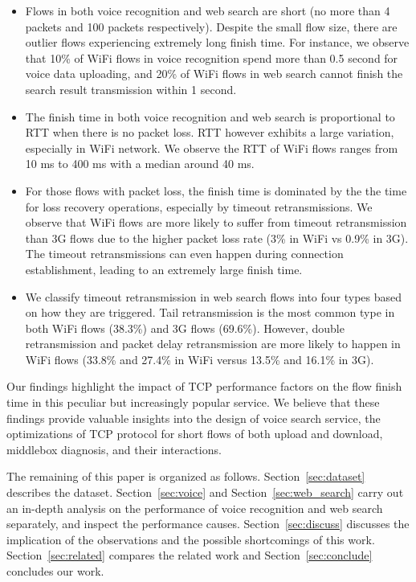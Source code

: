 

\begin{itemize}
\item Flows in both voice recognition and web search are short (no more than 4 packets and 100 packets respectively). Despite the small flow size, there are outlier flows experiencing extremely long finish time. For instance, we observe that 10\% of WiFi flows in voice recognition spend more than 0.5 second for voice data uploading, and 20\% of WiFi flows in web search cannot finish the search result transmission within 1 second.

\item The finish time in both voice recognition and web search is proportional to RTT when there is no packet loss. RTT however exhibits a large variation, especially in WiFi network. We observe the RTT of WiFi flows ranges from 10 ms to 400 ms with a median around 40 ms. 

\item For those flows with packet loss, the finish time is dominated by the the time for loss recovery operations, especially by timeout retransmissions. We observe that WiFi flows are more likely to suffer from timeout retransmission than 3G flows due to the higher packet loss rate (3\% in WiFi vs 0.9\% in 3G). The timeout retransmissions can even happen during connection establishment, leading to an extremely large finish time.

\item We classify timeout retransmission in web search flows into four types based on how they are triggered. Tail retransmission is the most common type in both WiFi flows (38.3\%) and 3G flows (69.6\%). However, double retransmission and packet delay retransmission are more likely to happen in WiFi flows (33.8\% and 27.4\% in WiFi versus 13.5\% and 16.1\% in 3G).

\end{itemize}

Our findings highlight the impact of TCP performance factors on the flow finish time in this peculiar but increasingly popular service. We believe that these findings provide valuable insights into the design of voice search service, the optimizations of TCP protocol for short flows of both upload and download, middlebox diagnosis, and their interactions.

The remaining of this paper is organized as follows. Section~\ref{sec:dataset} describes the dataset. Section~\ref{sec:voice} and Section~\ref{sec:web_search} carry out an in-depth analysis on the performance of voice recognition and web search separately, and inspect the performance causes. Section~\ref{sec:discuss} discusses the implication of the observations and the possible shortcomings of this work. Section~\ref{sec:related} compares the related work and Section~\ref{sec:conclude} concludes our work. 
